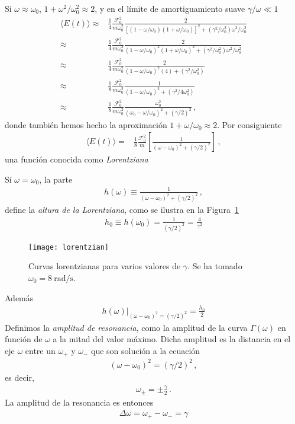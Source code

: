 \begin{frame}
Si $\omega\approx\omega_0$, $1+\omega^2/\omega_0^2\approx 2$, y en el límite de amortiguamiento suave $\gamma/\omega\ll1$
\begin{align*}
 \langle E(t)\rangle\approx&\frac{1}{4}\frac{\mathcal{F}_0^2}{m\omega_0^2}\frac{2}{[(1-{\omega}/{\omega_0})(1+{\omega}/{\omega_0})]^2+(\gamma^2/\omega_0^2)\omega^2/\omega_0^2}\nonumber\\
 \approx&\frac{1}{4}\frac{\mathcal{F}_0^2}{m\omega_0^2}\frac{2}{(1-{\omega}/{\omega_0})^2(1+{\omega}/{\omega_0})^2+(\gamma^2/\omega_0^2)\omega^2/\omega_0^2}\nonumber\\
\approx&\frac{1}{4}\frac{\mathcal{F}_0^2}{m\omega_0^2}\frac{2}{(1-{\omega}/{\omega_0})^2(4)+(\gamma^2/\omega_0^2)}\nonumber\\
\approx&\frac{1}{8}\frac{\mathcal{F}_0^2}{m\omega_0^2}\frac{1}{(1-{\omega}/{\omega_0})^2+(\gamma^2/4\omega_0^2)}\nonumber\\
\approx&\frac{1}{8}\frac{\mathcal{F}_0^2}{m\omega_0^2}\frac{\omega_0^2}{(\omega_0-{\omega}/{\omega_0})^2+(\gamma/2)^2}\,,
\end{align*}
donde también hemos hecho la aproximación $1+\omega/\omega_0\approx 2$. Por consiguiente 
\begin{align*}
   \langle E(t)\rangle=&\frac{1}{8}\frac{\mathcal{F}_0^2}{m}
   \left[\frac{1}{(\omega-\omega_0)^2+(\gamma/2)^2}\right]\,,
\end{align*}
una función conocida como \emph{Lorentziana}
\end{frame}

Sí $\omega=\omega_0$, la parte
\begin{align*}
  h(\omega)\equiv\frac{1}{(\omega-\omega_0)^2+(\gamma/2)^2}\,,
\end{align*}
define la \emph{altura de la Lorentziana}, como se ilustra en la Figura~\ref{fig:lorentzian}
\begin{align*}
 h_0\equiv h(\omega_0)=\frac{1}{(\gamma/2)^2}=\frac{4}{\gamma^2}
\end{align*}
\begin{figure}
  \centering
  \texttt{[image: lorentzian]}
  \caption{Curvas lorentzianas para varios valores de $\gamma$. Se ha tomado $\omega_0=\SI{8}{\radian\per\second}$.}
  \label{fig:lorentzian}
\end{figure}
Además 
\begin{align*}
  \left.h(\omega)\right|_{(\omega-\omega_0)^2=(\gamma/2)^2}=\frac{h_0}{2}
\end{align*}
Definimos la \emph{amplitud de resonancia}, como la amplitud de la curva $\Gamma(\omega)$ en función de $\omega$ a la mitad del valor máximo. Dicha amplitud es la distancia en el eje $\omega$ entre un $\omega_+$ y $\omega_-$ que son solución a la ecuación
\begin{align*}
  (\omega-\omega_0)^2=(\gamma/2)^2\,,
\end{align*}
es decir,
\begin{align*}
  \omega_{\pm}=\pm \frac{\gamma}{2}\,.
\end{align*}
La amplitud de la resonancia es entonces
\begin{align*}
  \Delta\omega=\omega_+-\omega_-=\gamma
\end{align*}

